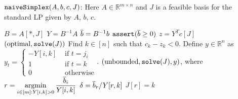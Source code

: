 \begin{algorithm}[H]
\caption{$\operatorname{\mathtt{naiveSimplex}}(A, b, c, J)$:
Here $A \in \mathbb{R}^{m \times n}$ and $J$ is a feasible basis
for the standard LP given by $A$, $b$, $c$.}
\begin{algorithmic}[1]
    \State $B = A[*,J]$
    \State \label{alg-line:naive-simplex:Y}$Y = B^{-1}A$  
    \State $\overline{b} = B^{-1}b$
    \State \label{alg-line:naive-simplex:bline-positive}$\operatorname{\mathtt{assert}}(\overline{b} \ge 0)$
    \State $z = Y^Tc[J]$
        \State \Return $(\textrm{optimal}, \operatorname{\mathtt{solve}}(J))$
    \EndIf
    \State Find $k \in [n]$ such that $c_k - z_k < 0$.
    \State \label{alg-line:naive-simplex:y}Define $y \in \mathbb{R}^n$ as
        $\displaystyle y_t = \begin{cases}
            -Y[i, k] & \textrm{ if } t = j_i
            \\ 1 & \textrm{ if } t = k
            \\ 0 & \textrm{ otherwise}
        \end{cases}$.
    \label{alg-line:naive-simplex:Y-neg}
        \State \Return $(\textrm{unbounded}, \operatorname{\mathtt{solve}}(J), y)$, where
    \EndIf
    \State $\displaystyle r = \operatorname*{argmin}_{i \in [m]: Y[i, k] > 0} \frac{\overline{b}_i}{Y[i, k]}$
    \State $\delta = \overline{b}_r/Y[r, k]$
    \State \label{alg-line:naive-simplex:J}$J[r] = k$  
\EndWhile
\end{algorithmic}
\label{algo:naive-simplex}
\end{algorithm}

